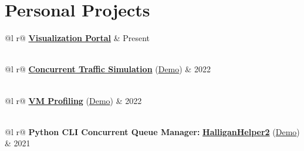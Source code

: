 \documentclass[letter,10pt]{article}
\begin{document}

\section{Personal Projects}

\begin{tabularx}{\linewidth}{ @{}l r@{} }
    \href{}{\textbf{Visualization Portal}} & \hfill Present \\[3.75pt]
      \\[3.75pt]
\end{tabularx}

\begin{tabularx}{\linewidth}{ @{}l r@{} }
    \href{https://github.com/liam-strand/cs-21-final-project}{\textbf{Concurrent Traffic Simulation}} (\href{https://youtu.be/AVGBph_Bcno}{Demo}) & \hfill 2022 \\[3.75pt]
      \\[3.75pt]
\end{tabularx}

\begin{tabularx}{\linewidth}{ @{}l r@{} }
    \href{https://github.com/liam-strand/comp-40-VM-Profiling}{\textbf{VM Profiling}} (\href{https://youtu.be/OnzkSmFvxiM}{Demo}) & \hfill 2022 \\[3.75pt]
     \\[3.75pt]
\end{tabularx}

\begin{tabularx}{\linewidth}{ @{}l r@{} }
    \textbf{Python CLI Concurrent Queue Manager:} \href{https://github.com/liam-strand/HalliganHelper2}{\textbf{HalliganHelper2}} (\href{https://youtu.be/qPwZz3OVA7A}{Demo}) & \hfill 2021 \\[3.75pt]
     \\[3.75pt]
\end{tabularx}
\end{document}
